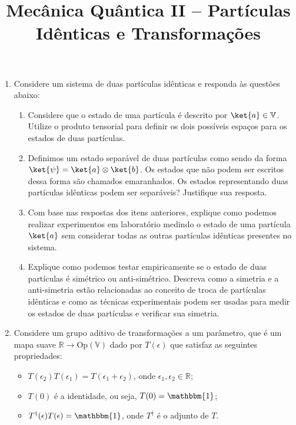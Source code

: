 \newif\ifuseseminar
\useseminartrue


\title{Mecânica Quântica II -- Partículas Idênticas e Transformações}


\begin{enumerate}
	\item Considere um sistema de duas partículas idênticas e responda às questões
	      abaixo:
	      \begin{enumerate}
		      \item Considere que o estado de uma partícula é descrito por $\ket{a} \in
			            \mathbb{V}$. Utilize o produto tensorial para definir os dois possíveis
		            espaços para os estados de duas partículas.
		      \item Definimos um estado separável de duas partículas como sendo da forma
		            $\ket{\psi} = \ket{a}\otimes\ket{b}$. Os estados que não podem ser
		            escritos dessa forma são chamados emaranhados. Os estados representando
		            duas partículas idênticas podem ser separáveis? Justifique sua resposta.
		      \item Com base nas respostas dos itens anteriores, explique como podemos
		            realizar experimentos em laboratório medindo o estado de uma partícula
		            $\ket{a}$ sem considerar todas as outras partículas idênticas presentes no
		            sistema.
		      \item Explique como podemos testar empiricamente se o estado de duas
		            partículas é simétrico ou anti-simétrico. Descreva como a simetria e a
		            anti-simetria estão relacionadas ao conceito de troca de partículas
		            idênticas e como as técnicas experimentais podem ser usadas para medir os
		            estados de duas partículas e verificar sua simetria.
	      \end{enumerate}
	\item Considere um grupo aditivo de transformações a um parâmetro, que é um mapa
	      suave $\mathbb{R} \to \mathrm{Op}(\mathbb{V})$ dado por $T(\epsilon)$ que satisfaz
	      as seguintes propriedades:
	      \begin{itemize}
		      \item $T(\epsilon_2)T(\epsilon_1) = T(\epsilon_1+\epsilon_2)$, onde
		            $\epsilon_1,\epsilon_2 \in \mathbb{R}$;
		      \item $T(0)$ é a identidade, ou seja, $T(0)=\mathbbm{1}$;
		      \item $T^\dagger(\epsilon)T(\epsilon)=\mathbbm{1}$, onde $T^\dagger$ é o adjunto de $T$.

\end{itemize}
\end{enumerate}
